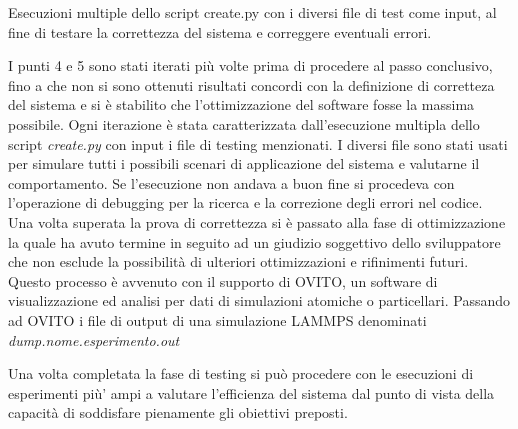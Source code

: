 \documentclass[Lau, oneside]{sapthesis}
\begin{document}
Esecuzioni multiple dello script create.py con i diversi file di test come input, al fine di testare la correttezza del sistema e correggere eventuali errori.


I punti 4 e 5 sono stati iterati più volte prima di procedere al passo conclusivo, fino a che non si sono ottenuti risultati concordi con la definizione di corretteza del sistema e si \`e stabilito che l'ottimizzazione del software fosse la massima possibile. Ogni iterazione \`e stata caratterizzata dall'esecuzione multipla dello script \textit{create.py} con input i file di testing menzionati. I diversi file sono stati usati per simulare tutti i possibili scenari di applicazione del sistema e valutarne il comportamento. Se l'esecuzione non andava a buon fine si procedeva con l'operazione di debugging per la ricerca e la correzione degli errori nel codice. Una volta superata la prova di correttezza si \`e passato alla fase di ottimizzazione la quale ha avuto termine in seguito ad un giudizio soggettivo dello sviluppatore che non esclude la possibilità di ulteriori ottimizzazioni e rifinimenti futuri. 
Questo processo \`e avvenuto con il supporto di OVITO, un software di visualizzazione ed analisi per dati di simulazioni atomiche o particellari. Passando ad OVITO i file di output di una simulazione LAMMPS denominati \textit{dump.nome.esperimento.out}


Una volta completata la fase di testing si può procedere con le esecuzioni di esperimenti più' ampi  a valutare l'efficienza del sistema dal punto di vista della capacità di soddisfare pienamente gli obiettivi preposti.


\newpage
\end{document}
